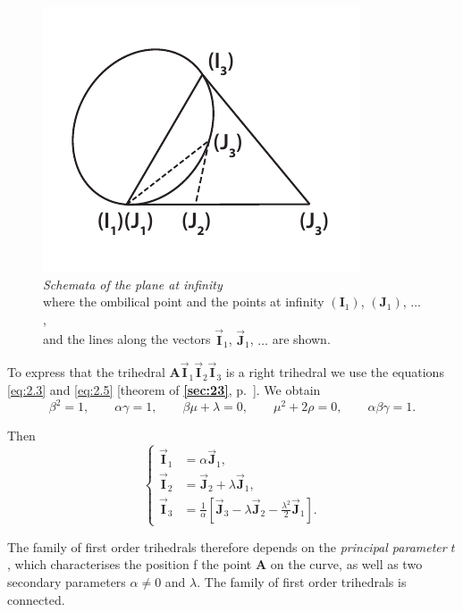 \documentclass[leqno,11pt]{book}
\numberwithin{equation}{chapter}
\theoremstyle{shape1}
\theoremstyle{shapesmall}
\newcommand{\fsref}[1]{{\rm\textsection\textbf{\ref{sec:#1}}}}
\newcommand{\rvec}[1]{\vec{\mathbf{#1}}}
\newcommand{\ivec}{\rvec{I}}
\newcommand{\jvec}{\rvec{J}}
\newcommand{\somespace}{\vspace{9pt}}
\begin{document}
\begin{figure}[h]
  \centering
\includegraphics{cartangrp-f2}  
  \caption[]{\emph{Schemata of the plane at infinity}\\where the ombilical point and the points at infinity $(\mathbf{I}_{1})$, $(\mathbf{J}_{1})$, $\dots$,\\and the lines along the vectors $\ivec_{1}$, $\jvec_{1}$, $\dots$ are shown.}
\end{figure}

To express that the trihedral $\mathbf{A}\ivec_{1}\ivec_{2}\ivec_{3}$ is a right trihedral we use the equations \eqref{eq:2.3} and \eqref{eq:2.5} [theorem of \fsref{23}, p.~\pageref{sec:23}]. We obtain
\[
\beta^{2}=1,\qquad\alpha\gamma=1,\qquad\beta\mu+\lambda=0,\qquad\mu^{2}+2\rho=0,\qquad\alpha\beta\gamma=1.
\]

Then
\begin{equation}
  \label{eq:2.11}
  \left\{
    \begin{aligned}
      \ivec_{1}&=\alpha\jvec_{1},\\
      \ivec_{2}&=\jvec_{2}+\lambda\jvec_{1},\\
      \ivec_{3}&=\frac{1}{\alpha}\left[\jvec_{3}-\lambda\jvec_{2}-\frac{\lambda^{2}}{2}\jvec_{1}\right].
    \end{aligned}
  \right.
\end{equation}

The family of first order trihedrals therefore depends on the \emph{principal parameter} $t$, which characterises the position f the point $\mathbf{A}$ on the curve, as well as two secondary parameters $\alpha\neq 0$ and $\lambda$. The family of first order trihedrals is connected.

\somespace
\end{document}
